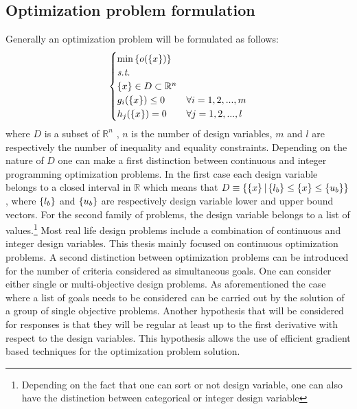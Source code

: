 \subsection {Optimization problem formulation}
Generally an optimization problem will be formulated as follows:
\begin{equation}
\label{nlp}
\begin{cases}
\min{\ensuremath\left\lbrace{o(\ensuremath\left\lbrace{x}\right \rbrace)}\right \rbrace}\\
\textit{s.t.}\\
\left\lbrace{x}\right \rbrace\in D \subset \mathbb{R}^{n}\\
g_i(\left\lbrace{x}\right \rbrace)\leq 0 & \forall i=1,2,...,m\\
h_j(\left\lbrace{x}\right \rbrace)=0 & \forall j=1,2,...,l
\end{cases}
\end{equation}
where $D$ is a subset of $\mathbb{R}^{n}$ , $n$ is the number of design variables, $m$ and $l$ are respectively the number of inequality and equality constraints. Depending on the nature of $D$ one can make a first distinction between continuous and integer programming optimization problems. In the first case each design variable belongs to a closed interval in $\mathbb{R}$ which means that $D\equiv\lbrace \left\lbrace{x}\right \rbrace | \left\lbrace{l_b}\right \rbrace\leq\left\lbrace{x}\right \rbrace\leq \left\lbrace{u_b}\right \rbrace\rbrace$, where $\left\lbrace{l_b}\right \rbrace$ and $\left\lbrace{u_b}\right \rbrace$ are respectively design variable lower and upper bound vectors. For the second family of problems, the design variable belongs to a list of values.\footnote{Depending on the fact that one can sort or not design variable, one can also have the distinction between categorical or integer design variable} Most real life design problems include a combination of continuous and integer design variables. 
This thesis mainly focused on continuous optimization problems. A second distinction between optimization problems can be introduced for the number of criteria considered as simultaneous goals. One can consider either single or multi-objective design problems. As aforementioned the case where a list of goals needs to be considered can be carried out by the solution of a group of single objective problems. Another hypothesis that will be considered for responses is that they will be regular at least up to the first derivative with respect to the design variables. This hypothesis allows the use of efficient gradient based techniques for the optimization problem solution. 
 
